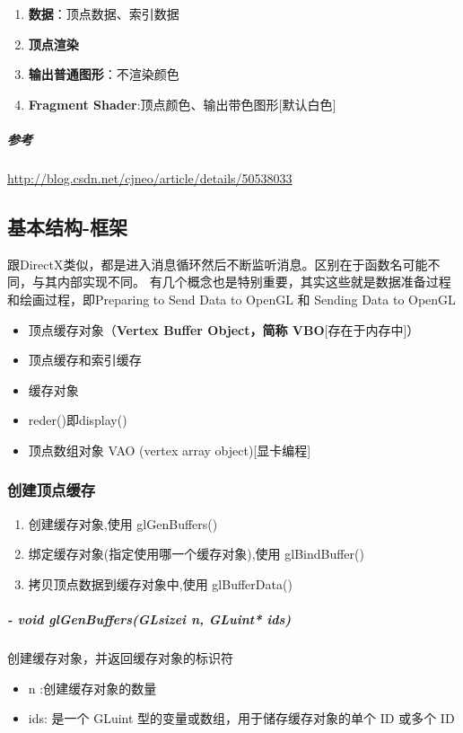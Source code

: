 \documentclass[UTF8,a4paper,8pt]{ctexart}
\begin{document}
		\begin{enumerate}
			\item \textbf{数据}：顶点数据、索引数据
			\item \textbf{顶点渲染}
			\item \textbf{输出普通图形}：不渲染颜色
			\item \textbf{Fragment Shader}:顶点颜色、输出带色图形[默认白色]
		\end{enumerate}
		
		\subparagraph{参考}\url{http://blog.csdn.net/cjneo/article/details/50538033}
	\subsection{基本结构-框架}
		跟DirectX类似，都是进入消息循环然后不断监听消息。区别在于函数名可能不同，与其内部实现不同。
		有几个概念也是特别重要，其实这些就是数据准备过程和绘画过程，即Preparing to Send Data to OpenGL 和 Sending Data to OpenGL
		
		\begin{itemize}
			\item  顶点缓存对象（\textbf{Vertex Buffer Object，简称 VBO}[存在于内存中]）
			\item  顶点缓存和索引缓存
			\item  缓存对象
			\item  reder()即display()
			\item 顶点数组对象 VAO (vertex array object)[显卡编程]
		\end{itemize}
		
		\subsubsection{创建顶点缓存}
			\begin{enumerate}
				\item 创建缓存对象,使用 glGenBuffers()
				\item 绑定缓存对象(指定使用哪一个缓存对象),使用 glBindBuffer()
				\item 拷贝顶点数据到缓存对象中,使用 glBufferData()
			\end{enumerate}
			
			\subparagraph{- void glGenBuffers(GLsizei n, GLuint* ids)}创建缓存对象，并返回缓存对象的标识符
				\begin{itemize}
					\item n :创建缓存对象的数量
					\item ids: 是一个 GLuint 型的变量或数组，用于储存缓存对象的单个 ID 或多个 ID
				\end{itemize}
				
\end{document}
